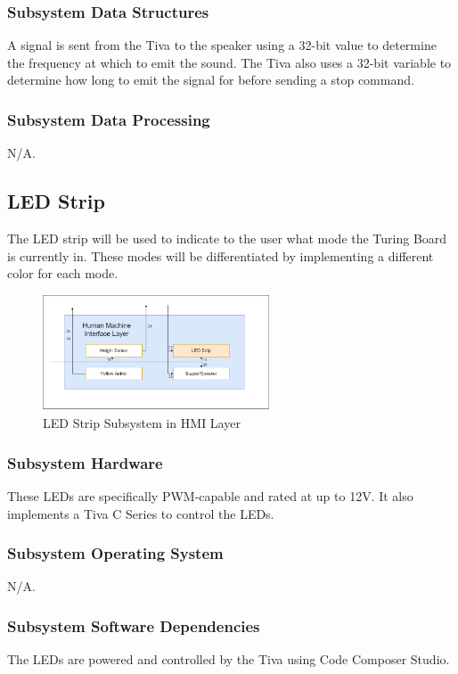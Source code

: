 \subsubsection{Subsystem Data Structures}
A signal is sent from the Tiva to the speaker using a 32-bit value to determine the frequency at which to emit the sound. The Tiva also uses a 32-bit variable to determine how long to emit the signal for before sending a stop command.

\subsubsection{Subsystem Data Processing}
N/A.

\subsection{LED Strip}
The LED strip will be used to indicate to the user what mode the Turing Board is currently in. These modes will be differentiated by implementing a different color for each mode. 

\begin{figure}[h!]
	\centering
 	\includegraphics[width=0.60\textwidth]{images/Kendall/LED Strip.png}
 \caption{LED Strip Subsystem in HMI Layer}
\end{figure}

\subsubsection{Subsystem Hardware}
These LEDs are specifically PWM-capable and rated at up to 12V. It also implements a Tiva C Series to control the LEDs.

\subsubsection{Subsystem Operating System}
N/A.

\subsubsection{Subsystem Software Dependencies}
The LEDs are powered and controlled by the Tiva using Code Composer Studio.

